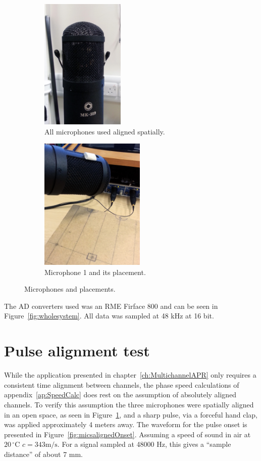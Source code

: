 \begin{figure}
\centering
\begin{subfigure}{.5\textwidth}
  \centering
  \includegraphics[width=4cm]{micsAlign}%
  \caption{All microphones used aligned spatially.}
  \label{fig:micsaligned}
\end{subfigure}%
\begin{subfigure}{.5\textwidth}
  \centering
  \includegraphics[width=5cm]{mic1}%
  \caption{Microphone 1 and its placement.}
  \label{fig:mic1}
\end{subfigure}
\caption{Microphones and placements.}
\label{fig:mic123}
\end{figure}

The AD converters used was an RME Firface 800 and can be seen in Figure~\ref{fig:wholesystem}. All data was sampled at 48 kHz at 16 bit.

\section{Pulse alignment test}\label{sec:MultiAPRsystemAligntest}
While the application presented in chapter~\ref{ch:MultichannelAPR} only requires a consistent time alignment between channels, the phase speed calculations of appendix~\ref{ap:SpeedCalc} does rest on the assumption of absolutely aligned channels. To verify this assumption the three microphones were spatially aligned in an open space, as seen in Figure~\ref{fig:micsaligned}, and a sharp pulse, via a forceful hand clap, was applied approximately 4 meters away. The waveform for the pulse onset is presented in Figure~\ref{fig:micsalignedOnset}. Assuming a speed of sound in air at $20\,^{\circ}\mathrm{C}$ $c = 343 \mathrm{m}/\mathrm{s}$. For a signal sampled at 48000 Hz, this gives a ``sample distance'' of about 7 mm.

